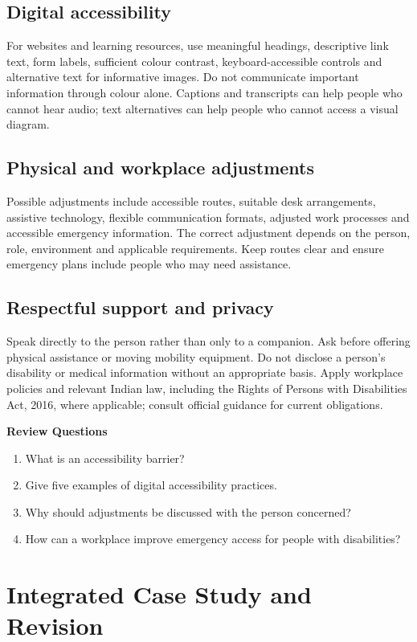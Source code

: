 \documentclass[11pt,openany,oneside]{book}
\begin{document}
\section{Digital accessibility}
For websites and learning resources, use meaningful headings, descriptive link text, form labels, sufficient colour contrast, keyboard-accessible controls and alternative text for informative images. Do not communicate important information through colour alone. Captions and transcripts can help people who cannot hear audio; text alternatives can help people who cannot access a visual diagram.

\section{Physical and workplace adjustments}
Possible adjustments include accessible routes, suitable desk arrangements, assistive technology, flexible communication formats, adjusted work processes and accessible emergency information. The correct adjustment depends on the person, role, environment and applicable requirements. Keep routes clear and ensure emergency plans include people who may need assistance.

\section{Respectful support and privacy}
Speak directly to the person rather than only to a companion. Ask before offering physical assistance or moving mobility equipment. Do not disclose a person's disability or medical information without an appropriate basis. Apply workplace policies and relevant Indian law, including the Rights of Persons with Disabilities Act, 2016, where applicable; consult official guidance for current obligations.

\par\noindent\textbf{Review Questions}\begin{enumerate}[label=\arabic*.,leftmargin=1.8em,itemsep=2pt,topsep=2pt]
\item What is an accessibility barrier?
\item Give five examples of digital accessibility practices.
\item Why should adjustments be discussed with the person concerned?
\item How can a workplace improve emergency access for people with disabilities?
\end{enumerate}

\chapter{Integrated Case Study and Revision}
\end{document}
